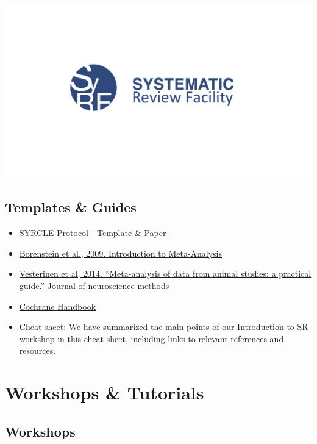 \documentclass[
]{book}
\providecommand{\tightlist}{%
  \setlength{\itemsep}{0pt}\setlength{\parskip}{0pt}}
\begin{document}
\includegraphics{figs/syrf-logo.png}

\section{Templates \& Guides}\label{templates-guides}

\begin{itemize}
\tightlist
\item
  \href{https://onlinelibrary.wiley.com/doi/epdf/10.1002/ebm2.7}{SYRCLE Protocol - Template \& Paper}
\item
  \href{https://onlinelibrary.wiley.com/doi/book/10.1002/9780470743386}{Borenstein et al., 2009. Introduction to Meta-Analysis}
\item
  \href{https://doi.org/10.1016/j.jneumeth.2013.09.010}{Vesterinen et al, 2014. ``Meta-analysis of data from animal studies: a practical guide.'' Journal of neuroscience methods}
\item
  \href{https://training.cochrane.org/handbook/current}{Cochrane Handbook}
\item
  \href{CheatSheet_IntroSRworkshop_2023.pdf}{Cheat sheet}: We have summarized the main points of our Introduction to SR workshop in this cheat sheet, including links to relevant references and resources.
\end{itemize}

\chapter{Workshops \& Tutorials}\label{workshops}

\section{Workshops}\label{workshops-1}
\end{document}
